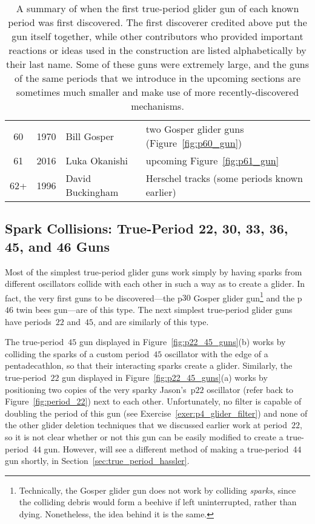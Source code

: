 \begin{table}[htbp]
\begin{center}
\begin{tabular}{ccll}
			\rowcolor{gray!20} 60 & 1970 & Bill Gosper & two Gosper glider guns (Figure~\ref{fig:p60_gun}) \\
			61 & 2016 & Luka Okanishi & upcoming Figure~\ref{fig:p61_gun} \\
			\rowcolor{gray!20} 62+ & 1996 & David Buckingham & Herschel tracks (some periods known earlier) \\\bottomrule
		\end{tabular}
		\caption{A summary of when the first true-period glider gun of each known period was first discovered. The first discoverer credited above put the gun itself together, while other contributors who provided important reactions or ideas used in the construction are listed alphabetically by their last name. Some of these guns were extremely large, and the guns of the same periods that we introduce in the upcoming sections are sometimes much smaller and make use of more recently-discovered mechanisms.}\label{tab:true_period_glider_gun}
	\end{center}
\end{table}


\subsection{Spark Collisions: True-Period 22, 30, 33, 36, 45, and 46 Guns}\label{sec:true_period_spark}

Most of the simplest true-period glider guns work simply by having sparks from different oscillators collide with each other in such a way as to create a glider. In fact, the very first guns to be discovered---the p$30$ Gosper glider gun\footnote{Technically, the Gosper glider gun does not work by colliding \emph{sparks}, since the colliding debris would form a beehive if left uninterrupted, rather than dying. Nonetheless, the idea behind it is the same.} and the p$46$ twin bees gun---are of this type. The next simplest true-period glider guns have periods~$22$ and~$45$, and are similarly of this type.

The true-period~$45$ gun displayed in Figure~\ref{fig:p22_45_guns}(b) works by colliding the sparks of a custom period~$45$ oscillator with the edge of a pentadecathlon, so that their interacting sparks create a glider. Similarly, the true-period~$22$ gun displayed in Figure~\ref{fig:p22_45_guns}(a) works by positioning two copies of the very sparky Jason's~p$22$ oscillator (refer back to Figure~\ref{fig:period_22}) next to each other. Unfortunately, no filter is capable of doubling the period of this gun (see Exercise~\ref{exer:p4_glider_filter}) and none of the other glider deletion techniques that we discussed earlier work at period~$22$, so it is not clear whether or not this gun can be easily modified to create a true-period~$44$ gun. However, will see a different method of making a true-period~$44$ gun shortly, in Section~\ref{sec:true_period_hassler}.


